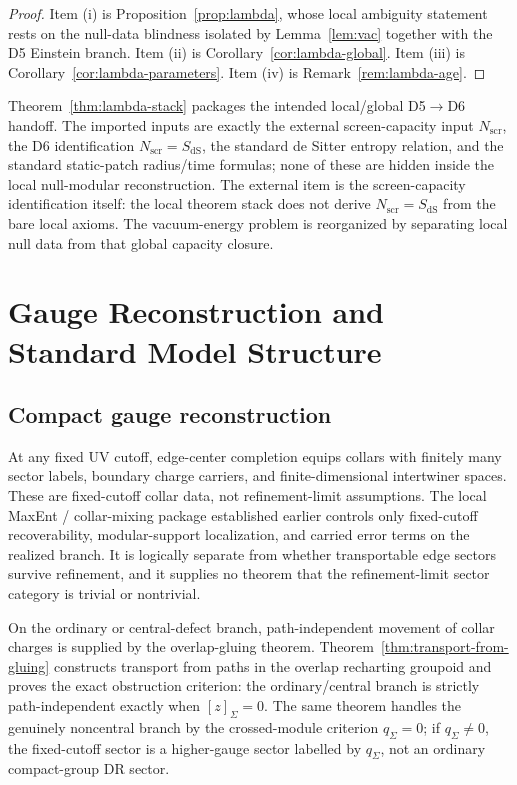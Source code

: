 \documentclass[11pt]{article}
\begin{document}
\begin{proof}
Item \textup{(i)} is Proposition~\ref{prop:lambda}, whose local ambiguity statement rests on the null-data blindness isolated by Lemma~\ref{lem:vac} together with the D5 Einstein branch. Item \textup{(ii)} is Corollary~\ref{cor:lambda-global}. Item \textup{(iii)} is Corollary~\ref{cor:lambda-parameters}. Item \textup{(iv)} is Remark~\ref{rem:lambda-age}.
\end{proof}

Theorem~\ref{thm:lambda-stack} packages the intended local/global D5\(\to\)D6 handoff. The imported inputs are exactly the external screen-capacity input \(N_{\mathrm{scr}}\), the D6 identification \(N_{\mathrm{scr}}=S_{\mathrm{dS}}\), the standard de Sitter entropy relation, and the standard static-patch radius/time formulas; none of these are hidden inside the local null-modular reconstruction. The external item is the screen-capacity identification itself: the local theorem stack does not derive \(N_{\mathrm{scr}}=S_{\mathrm{dS}}\) from the bare local axioms. The vacuum-energy problem is reorganized by separating local null data from that global capacity closure.

\section{Gauge Reconstruction and Standard Model Structure}

\subsection{Compact gauge reconstruction}

At any fixed UV cutoff, edge-center completion equips collars with finitely many sector labels, boundary charge carriers, and finite-dimensional intertwiner spaces. These are fixed-cutoff collar data, not refinement-limit assumptions. The local MaxEnt / collar-mixing package established earlier controls only fixed-cutoff recoverability, modular-support localization, and carried error terms on the realized branch. It is logically separate from whether transportable edge sectors survive refinement, and it supplies no theorem that the refinement-limit sector category is trivial or nontrivial.

On the ordinary or central-defect branch, path-independent movement of collar charges is supplied by the overlap-gluing theorem. Theorem~\ref{thm:transport-from-gluing} constructs transport from paths in the overlap recharting groupoid and proves the exact obstruction criterion: the ordinary/central branch is strictly path-independent exactly when \([z]_\Sigma=0\). The same theorem handles the genuinely noncentral branch by the crossed-module criterion \(q_\Sigma=0\); if \(q_\Sigma\ne0\), the fixed-cutoff sector is a higher-gauge sector labelled by \(q_\Sigma\), not an ordinary compact-group DR sector.
\end{document}
